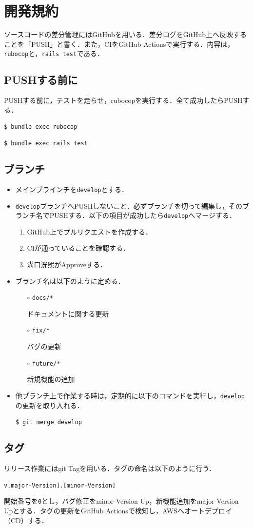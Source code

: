 \section{開発規約}\label{q3.3}
ソースコードの差分管理にはGitHubを用いる．差分ログをGitHub上へ反映することを「PUSH」と書く．また，CIをGitHub Actionsで実行する．内容は，\texttt{rubocop}と，\texttt{rails test}である．
\subsection{PUSHする前に}\label{q3.3.1}
PUSHする前に，テストを走らせ，rubocopを実行する．全て成功したらPUSHする．
\begin{screen}
    \texttt{\$ bundle exec rubocop}
    
    \texttt{\$ bundle exec rails test}
\end{screen}

\subsection{ブランチ}\label{q3.3.2}
\begin{itemize}
    \item メインブラインチを\texttt{develop}とする．
    
    \item \texttt{develop}ブランチへPUSHしないこと．必ずブランチを切って編集し，そのブランチ名でPUSHする．以下の項目が成功したら\texttt{develop}へマージする．
    \begin{enumerate}
        \item GitHub上でプルリクエストを作成する．
        \item CIが通っていることを確認する．
        \item 溝口洸熙がApproveする．
    \end{enumerate}
    
    \item ブランチ名は以下のように定める．
    \begin{itemize}
        \item[$\circ$] \texttt{docs/*}

        ドキュメントに関する更新
        \item[$\circ$] \texttt{fix/*}

        バグの更新
        \item[$\circ$] \texttt{future/*}

        新規機能の追加
    \end{itemize}
    
    \item 他ブランチ上で作業する時は，定期的に以下のコマンドを実行し，\texttt{develop}の更新を取り入れる．
    \begin{screen}
        \texttt{\$ git merge develop}
    \end{screen}
\end{itemize}

\subsection{タグ}\label{q3.3.3}
リリース作業にはgit Tagを用いる．タグの命名は以下のように行う．
\begin{screen}
    \texttt{v[major-Version].[minor-Version]}
\end{screen}

開始番号を\texttt{0}とし，バグ修正をminor-Version Up，新機能追加をmajor-Version Upとする．タグの更新をGitHub Actionsで検知し，AWSへオートデプロイ（CD）する．

